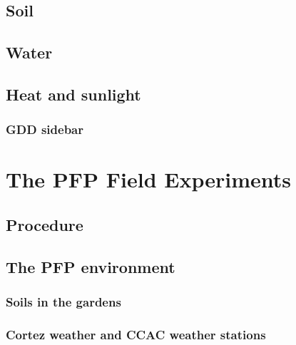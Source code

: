 \documentclass[12pt,]{krantz}
\begin{document}
\hypertarget{soil}{%
\section{Soil}\label{soil}}

\hypertarget{water}{%
\section{Water}\label{water}}

\hypertarget{heat-and-sunlight}{%
\section{Heat and sunlight}\label{heat-and-sunlight}}

\hypertarget{gdd-sidebar}{%
\subsection*{GDD sidebar}\label{gdd-sidebar}}


\hypertarget{the-pfp-field-experiments}{%
\chapter{The PFP Field Experiments}\label{the-pfp-field-experiments}}

\hypertarget{procedure}{%
\section{Procedure}\label{procedure}}

\hypertarget{the-pfp-environment}{%
\section{The PFP environment}\label{the-pfp-environment}}

\hypertarget{soils-in-the-gardens}{%
\subsection*{Soils in the gardens}\label{soils-in-the-gardens}}


\hypertarget{cortez-weather-and-ccac-weather-stations}{%
\subsection{Cortez weather and CCAC weather
stations}\label{cortez-weather-and-ccac-weather-stations}}
\end{document}
